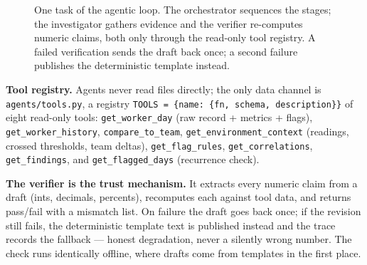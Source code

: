 \documentclass[11pt,a4paper]{article}
\begin{document}
\begin{figure}[htbp]
\centering
{}
\caption{One task of the agentic loop. The orchestrator sequences the
stages; the investigator gathers evidence and the verifier re-computes
numeric claims, both only through the read-only tool registry. A failed
verification sends the draft back once; a second failure publishes the
deterministic template instead.}
\label{fig:loop}
\end{figure}

\textbf{Tool registry.} Agents never read files directly; the only data
channel is \texttt{agents/tools.py}, a registry \texttt{TOOLS = \{name:
\{fn, schema, description\}\}} of eight read-only tools:
\texttt{get\_worker\_day} (raw record + metrics + flags),
\texttt{get\_worker\_history}, \texttt{compare\_to\_team},
\texttt{get\_environment\_context} (readings, crossed thresholds, team
deltas), \texttt{get\_flag\_rules}, \texttt{get\_correlations},
\texttt{get\_findings}, and \texttt{get\_flagged\_days} (recurrence check).

\textbf{The verifier is the trust mechanism.} It extracts every numeric
claim from a draft (ints, decimals, percents), recomputes each against tool
data, and returns pass/fail with a mismatch list. On failure the draft goes
back once; if the revision still fails, the deterministic template text is
published instead and the trace records the fallback --- honest
degradation, never a silently wrong number. The check runs identically
offline, where drafts come from templates in the first place.
\end{document}
